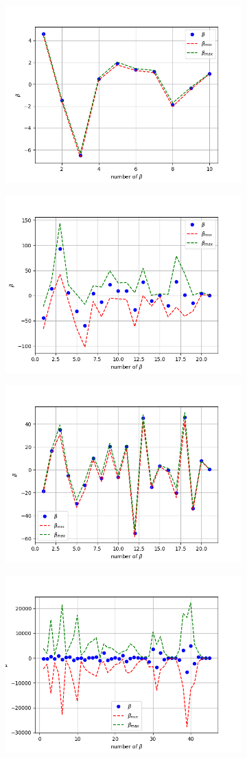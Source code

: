 \begin{figure}[!ht]
\begin{subfigure}{\textwidth}
  \centering
\includegraphics[width=0.5\linewidth]{images/betas/fake_linear_beta_p03_n100.png}
\end{subfigure}
\begin{subfigure}{\textwidth}
  \centering
\includegraphics[width=0.5\linewidth]{images/betas/fake_linear_beta_p05_n10.png}
\end{subfigure}
\begin{subfigure}{\textwidth}
  \centering
\includegraphics[width=0.5\linewidth]{images/betas/fake_linear_beta_p05_n100.png}
\end{subfigure}
\begin{subfigure}{\textwidth}
  \centering
\includegraphics[width=0.5\linewidth]{images/betas/fake_linear_beta_p08_n10.png}

\end{subfigure}
\end{figure}
